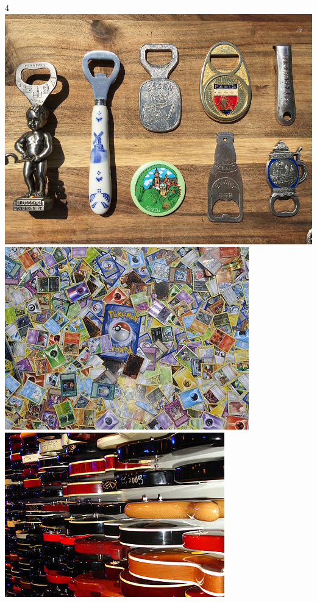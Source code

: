 \begin{frame}
\begin{textblock*}{4\TPHorizModule}
    \includegraphics*[height=1.5\TPVertModule,width=\TPHorizModule]{Collection_of_bottle_openers}
    \includegraphics*[height=1.5\TPVertModule,width=\TPHorizModule]{Pokemon_collection}
    \includegraphics*[height=1.5\TPVertModule,width=\TPHorizModule]{360px-Wall_of_guitars}
  \end{textblock*}
\end{frame}

